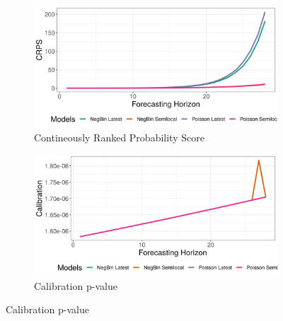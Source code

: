 \begin{figure}[H]
\begin{subfigure}{0.5\textwidth}
  \centering
  \includegraphics[width=\linewidth]{../output/Mandima_crps.png}  
  \caption{Contineously Ranked Probability Score}
  \label{Mandima_scores_1}
\end{subfigure}
\begin{subfigure}{0.5\textwidth}
  \centering
  \includegraphics[width=\linewidth]{../output/Mandima_calibration.png}  
  \caption{Calibration p-value}
  \label{Mandima_scores_2}
\end{subfigure}


\end{figure}

